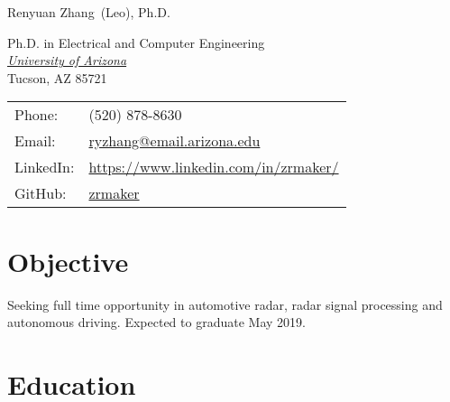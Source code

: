 \documentclass[letterpaper,9pt]{article}
\def\name{Renyuan Zhang}
\renewenvironment{itemize}{
  \begin{list}{}{
    \setlength{\topsep}{0pt}
    \setlength{\itemsep}{0pt}
    \setlength{\parsep}{0pt}
    \setlength{\partopsep}{0pt}
    \setlength{\leftmargin}{1.5em}
  }
}{\end{list}}
\begin{document}
{\huge \name \textnormal \ (Leo), Ph.D.}

\vspace{1em}

\begin{minipage}{0.55\linewidth}
  Ph.D. in Electrical and Computer Engineering \\
  \href{http://www.arizona.edu/}{\it University of Arizona} \\
  Tucson, AZ 85721
\end{minipage}
\begin{minipage}{0.4\linewidth}
  \begin{tabular}{ll}
    Phone: & (520) 878-8630 \\
    Email: & \href{mailto:ryzhang@email.arizona.edu}{ryzhang@email.arizona.edu} \\
    LinkedIn: & \href{https://www.linkedin.com/in/zrmaker/}{https://www.linkedin.com/in/zrmaker/} \\
    GitHub: & \href{https://github.com/zrmaker}{zrmaker}
  \end{tabular}
\end{minipage}

%

\section*{Objective}
\begin{itemize}
  \item Seeking full time opportunity in automotive radar, radar signal processing and autonomous driving. Expected to graduate May 2019.
\end{itemize}

\section*{Education}
\end{document}
